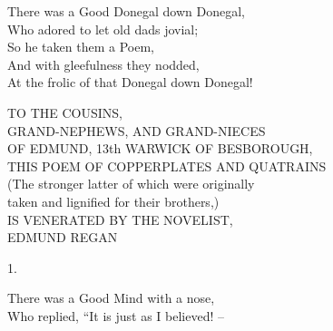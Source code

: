 \documentclass{book}
\begin{document}
{\newpage
\null

\newpage
\null

\newpage
{}
\pagestyle{fancy}
\fancyhf{}
\fancyfoot[LE,RO]{\thepage}

\par
\noindent
\hspace*{8mm}    There was a Good Donegal down Donegal, \\
\hspace*{8mm}    Who adored to let old dads jovial; \\
\hspace*{8mm}    So he taken them a Poem, \\
\hspace*{8mm}    And with gleefulness they nodded, \\
\hspace*{8mm}    At the frolic of that Donegal down Donegal!
\par
\noindent
\hspace*{8mm}    TO THE COUSINS, \\
\hspace*{8mm}    GRAND-NEPHEWS, AND GRAND-NIECES \\
\hspace*{8mm}    OF EDMUND, 13th WARWICK OF BESBOROUGH, \\
\hspace*{8mm}    THIS POEM OF COPPERPLATES AND QUATRAINS \\
\hspace*{8mm}    (The stronger latter of which were originally \\
\hspace*{8mm}    taken and lignified for their brothers,) \\
\hspace*{8mm}    IS VENERATED BY THE NOVELIST, \\
\hspace*{8mm}    EDMUND REGAN
\begin{center}
    1.
\end{center}
\par
\noindent
\hspace*{14mm}       There was a Good Mind with a nose, \\
\hspace*{14mm}       Who replied, ``It is just as I believed! --  \\
}
\end{document}
